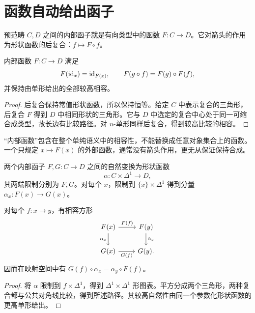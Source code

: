 \section{函数自动给出函子}
\begin{definition}[内部函子]
预范畴 $C,D$ 之间的内部函子就是有向类型中的函数 $F:C\to D$。它对箭头的作用为形状函数的后复合：$f\mapsto F\circ f$。
\end{definition}
\begin{proposition}[保持恒等与合成]
内部函数 $F:C\to D$ 满足
\[
F(\operatorname{id}_x)=\operatorname{id}_{F(x)},
\qquad
F(g\circ f)=F(g)\circ F(f),
\]
并保持由单形给出的全部较高相容。
\end{proposition}
\begin{proof}
后复合保持常值形状函数，所以保持恒等。给定 $C$ 中表示复合的三角形，后复合 $F$ 得到 $D$ 中相同形状的三角形。它与 $D$ 中选定的复合中心处于同一可缩合成类型，故长边有比较路径。对 $n$-单形同样后复合，得到较高比较的相容。
\end{proof}
\begin{remark}
“内部函数”包含在整个单纯语义中的相容性，不能替换成任意对象集合上的函数。一个只规定 $x\mapsto F(x)$ 的外部函数，通常没有箭头作用，更无从保证保持合成。
\end{remark}
\begin{definition}[自然变换]
两个内部函子 $F,G:C\to D$ 之间的自然变换为形状函数
\[
\alpha:C\times\Delta^1\longrightarrow D,
\]
其两端限制分别为 $F,G$。对每个 $x$，限制到 $\{x\}\times\Delta^1$ 得到分量 $\alpha_x:F(x)\to G(x)$。
\end{definition}
\begin{proposition}[自然性方形]
对每个 $f:x\to y$，有相容方形
\[
\begin{tikzcd}
F(x)\ar[r,"F(f)"]\ar[d,"\alpha_x"']&F(y)\ar[d,"\alpha_y"]\\
G(x)\ar[r,"G(f)"']&G(y).
\end{tikzcd}
\]
因而在映射空间中有 $G(f)\circ\alpha_x=\alpha_y\circ F(f)$。
\end{proposition}
\begin{proof}
将 $\alpha$ 限制到 $f\times\Delta^1$，得到 $\Delta^1\times\Delta^1$ 形图表。平方分成两个三角形，两种复合都与公共对角线比较，得到所述路径。其较高自然性由同一个参数化形状函数的更高单形给出。
\end{proof}

